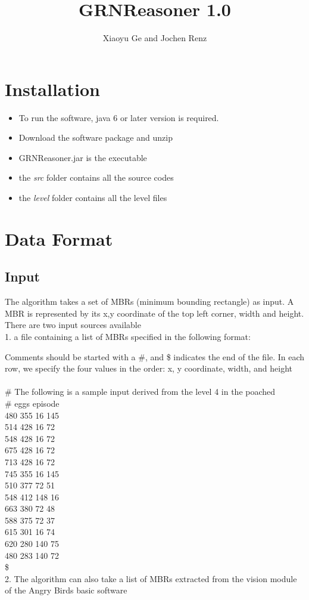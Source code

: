 \documentclass{article}
\title{GRNReasoner 1.0}
\author{Xiaoyu Ge and Jochen Renz}
\begin{document}
\maketitle
\section{Installation}
\begin{itemize}
\item To run the software, java 6 or later version is required.  
\item Download the software package and unzip
\item GRNReasoner.jar is the executable
\item the\textit{ src} folder contains all the source codes
\item the \textit{level} folder contains all the level files
\end{itemize}



\section{Data Format}
\subsection{Input}
The algorithm takes a set of MBRs (minimum bounding rectangle) as input. A MBR is represented by its x,y coordinate of the top left corner, width and height. There are two input sources available
\\1. a file containing a list of MBRs specified in the following format:

Comments should be started with a \#, and \$ indicates the end of the file. In each row, we specify the four values in the order: x, y coordinate, width, and height
\\\\\# The following is a sample input derived from the level 4 in the poached \\\# eggs episode
\\480 355 16 145
\\514 428 16 72
\\548 428 16 72
\\675 428 16 72
\\713 428 16 72
\\745 355 16 145
\\510 377 72 51 
\\548 412 148 16
\\663 380 72  48
\\588 375 72 37
\\615 301 16 74
\\620 280 140 75
\\480 283 140 72
\\\$ 
\\2. The algorithm can also take a list of MBRs extracted from the vision module of the Angry Birds basic software 
\end{document}
